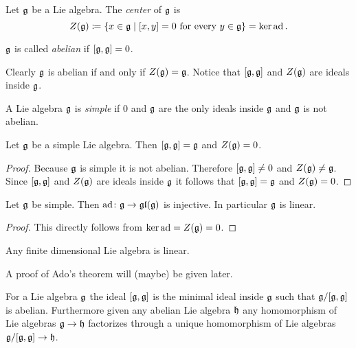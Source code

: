\begin{defi}
 Let $\mathfrak{g}$ be a Lie algebra. The \emph{center} of $\mathfrak{g}$ is
 \[
  Z(\mathfrak{g})
  \coloneqq \{x \in \mathfrak{g} \mid \text{$[x,y] = 0$ for every $y \in \mathfrak{g}$}\}
  = \ker \operatorname{ad}.
 \]
 
 $\mathfrak{g}$ is called \emph{abelian} if $[\mathfrak{g},\mathfrak{g}] = 0$.
\end{defi}


Clearly $\mathfrak{g}$ is abelian if and only if $Z(\mathfrak{g}) = \mathfrak{g}$. Notice that $[\mathfrak{g},\mathfrak{g}]$ and $Z(\mathfrak{g})$ are ideals inside $\mathfrak{g}$.


\begin{defi}
 A Lie algebra $\mathfrak{g}$ is \emph{simple} if $0$ and $\mathfrak{g}$ are the only ideals inside $\mathfrak{g}$ and $\mathfrak{g}$ is not abelian.
\end{defi}


\begin{lem}
 Let $\mathfrak{g}$ be a simple Lie algebra. Then $[\mathfrak{g},\mathfrak{g}] = \mathfrak{g}$ and $Z(\mathfrak{g})=0$.
\end{lem}
\begin{proof}
 Because $\mathfrak{g}$ is simple it is not abelian. Therefore $[\mathfrak{g},\mathfrak{g}] \neq 0$ and $Z(\mathfrak{g}) \neq \mathfrak{g}$. Since $[\mathfrak{g},\mathfrak{g}]$ and $Z(\mathfrak{g})$ are ideals inside $\mathfrak{g}$ it follows that $[\mathfrak{g},\mathfrak{g}] = \mathfrak{g}$ and $Z(\mathfrak{g}) = 0$.
\end{proof}


\begin{cor}
 Let $\mathfrak{g}$ be simple. Then $\operatorname{ad} \colon \mathfrak{g} \to \mathfrak{gl}(\mathfrak{g})$ is injective. In particular $\mathfrak{g}$ is linear.
\end{cor}
\begin{proof}
 This directly follows from $\ker \operatorname{ad} = Z(\mathfrak{g}) = 0$.
\end{proof}


\begin{thrm}[Ado]
 Any finite dimensional Lie algebra is linear.
\end{thrm}


A proof of Ado’s theorem will (maybe) be given later.


\begin{rem}
 For a Lie algebra $\mathfrak{g}$ the ideal $[\mathfrak{g},\mathfrak{g}]$ is the minimal ideal inside $\mathfrak{g}$ such that $\mathfrak{g}/[\mathfrak{g},\mathfrak{g}]$ is abelian. Furthermore given any abelian Lie algebra $\mathfrak{h}$ any homomorphism of Lie algebras $\mathfrak{g} \to \mathfrak{h}$ factorizes through a unique homomorphism of Lie algebras $\mathfrak{g}/[\mathfrak{g},\mathfrak{g}] \to \mathfrak{h}$.
 \begin{center}
 \end{center}
\end{rem}


